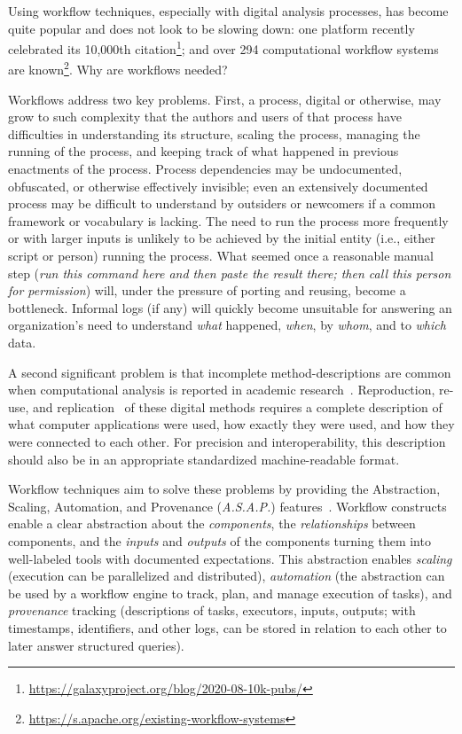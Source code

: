 \documentclass[sigconf,revew,screen,timestamp,nonacm]{acmart}
\begin{document}
Using workflow techniques, especially with digital analysis processes, has become quite popular and does not look to be slowing down: one platform recently celebrated its 10,000th citation\footnote{\url{https://galaxyproject.org/blog/2020-08-10k-pubs/}}; and over 294 computational workflow systems are known\footnote{\url{https://s.apache.org/existing-workflow-systems}}. Why are workflows needed?

Workflows address two key problems. First, a process, digital or otherwise, may grow to such complexity that the authors and users of that process have difficulties in understanding its structure, scaling the process, managing the running of the process, and keeping track of what happened in previous enactments of the process. Process dependencies may be undocumented, obfuscated, or otherwise effectively invisible; even an extensively documented process may be difficult to understand by outsiders or newcomers if a common framework or vocabulary is lacking. The need to run the process more frequently or with larger inputs is unlikely to be achieved  by the initial entity (i.e., either script or person) running the process. What seemed once a reasonable manual step (\textit{run this command here and then paste the result there; then call this person for permission}) will, under the pressure of porting and reusing, become a bottleneck. Informal logs (if any) will quickly become unsuitable for answering an organization's need to understand \textit{what} happened, \textit{when}, by \textit{whom}, and to \textit{which} data.

A second significant problem is that incomplete method-descriptions are common when computational analysis is reported in academic research~\cite{ivie_reproducibility_2018}. Reproduction, re-use, and replication~\cite{feitelson_repeatability_2015} of these digital methods requires a complete description of what computer applications were used, how exactly they were used, and how they were connected to each other. For precision and interoperability, this description should also be in an appropriate standardized machine-readable format.

Workflow techniques aim to solve these problems by providing the Abstraction, Scaling, Automation, and Provenance (\textit{A.S.A.P.}) features~\cite{cuevas-vicenttin_scientific_2012}.  Workflow constructs enable a clear abstraction about the \textit{components}, the \textit{relationships} between components, and the \textit{inputs} and \textit{outputs} of the components turning them into well-labeled tools with documented expectations. This abstraction enables \textit{scaling} (execution can be parallelized and distributed), \textit{automation} (the abstraction can be used by a workflow engine to track, plan, and manage execution of tasks), and \textit{provenance} tracking (descriptions of tasks, executors, inputs, outputs; with timestamps, identifiers, and other logs, can be stored in relation to each other to later answer structured queries).
\end{document}

